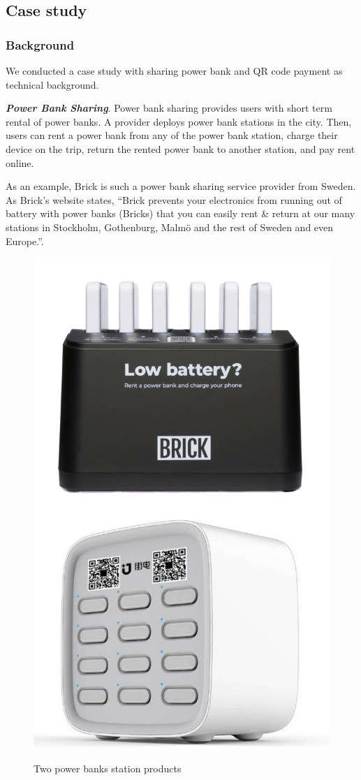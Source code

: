 \subsection{Case study}

\subsubsection{Background}

We conducted a case study with sharing power bank and QR code payment as technical background.

\textbf{\textit{Power Bank Sharing}}. 
Power bank sharing provides users with short term rental of power banks. A provider deploys power bank stations in the city. Then, users can rent a power bank from any of the power bank station, charge their device on the trip, return the rented power bank to another station, and pay rent online.

As an example, Brick is such a power bank sharing service provider from Sweden. As Brick's website states, ``Brick prevents your electronics from running out of battery with power banks (Bricks) that you can easily rent \& return at our many stations in Stockholm, Gothenburg, Malmö and the rest of Sweden and even Europe.''. 


\begin{figure}[hbtp]
	\centering
	\includegraphics[width=.4 \linewidth]{./Figs/Brick_station.png}
	\includegraphics[width=.4 \linewidth]{./Figs/jiedian.jpg}
	\caption{Two power banks station products}
	\label{fig:PBS_products}
\end{figure}

